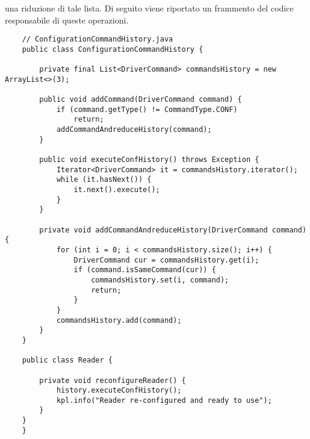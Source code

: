 una riduzione di tale lista. Di seguito viene riportato un frammento del codice responsabile di queste operazioni.
\begin{lstlisting}
    // ConfigurationCommandHistory.java
    public class ConfigurationCommandHistory {

        private final List<DriverCommand> commandsHistory = new ArrayList<>(3);

        public void addCommand(DriverCommand command) {
            if (command.getType() != CommandType.CONF)
                return;
            addCommandAndreduceHistory(command);
        }

        public void executeConfHistory() throws Exception {
            Iterator<DriverCommand> it = commandsHistory.iterator();
            while (it.hasNext()) {
                it.next().execute();
            }
        }

        private void addCommandAndreduceHistory(DriverCommand command) {
            for (int i = 0; i < commandsHistory.size(); i++) {
                DriverCommand cur = commandsHistory.get(i);
                if (command.isSameCommand(cur)) {
                    commandsHistory.set(i, command);
                    return;
                }
            }
            commandsHistory.add(command);
        }
    }

    public class Reader {

        private void reconfigureReader() {
			history.executeConfHistory();
			kpl.info("Reader re-configured and ready to use");
		}
	}
    }
\end{lstlisting}
